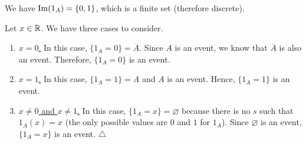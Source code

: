     \begin{problem}
    We have $\operatorname{Im} (1_A) = \{ 0, 1 \}$, which is a finite set (therefore discrete). 

    Let $x \in \mathbb{R}$. We have three cases to consider.
    \begin{enumerate}
        \item \underline{$x = 0$.} In this case, $\{ 1_A = 0\} = \overline{A}$. Since $A$ is an event, we know that $\overline{A}$ is also an event. Therefore, $\{ 1_A = 0 \}$ is an event.
        \item \underline{$x= 1$.} In this case, $\{ 1_A = 1 \} = A$ and $A$ is an event. Hence, $\{ 1_A = 1 \}$ is an event.
        \item \underline{$x \neq 0$ and $x \neq 1$.} In this case, $\{ 1_A = x \} = \varnothing$ because there is no $s$ such that $1_A (x) = x$ (the only possible values are $0$ and $1$ for $1_A$). Since $\varnothing$ is an event, $\{ 1_A = x \}$ is an event. \hfill $\triangle$
    \end{enumerate}
    \end{problem}

